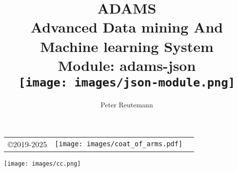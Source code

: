 \documentclass[a4paper]{book}
\title{
  \textbf{ADAMS} \\
  {\Large \textbf{A}dvanced \textbf{D}ata mining \textbf{A}nd \textbf{M}achine
  learning \textbf{S}ystem} \\
  {\Large Module: adams-json} \\
  \vspace{1cm}
  \texttt{[image: images/json-module.png]} \\
}
\author{
  Peter Reutemann
}
\begin{document}
\begin{titlepage}
\maketitle

\thispagestyle{empty}
\center
\begin{table}[b]
	\begin{tabular}{c l l}
		\parbox[c][2cm]{2cm}{\copyright 2019-2025} &
		\parbox[c][2cm]{5cm}{\texttt{[image: images/coat\_of\_arms.pdf]}} \\
	\end{tabular}
	\texttt{[image: images/cc.png]} \\
\end{table}

\end{titlepage}

\tableofcontents

\end{document}
